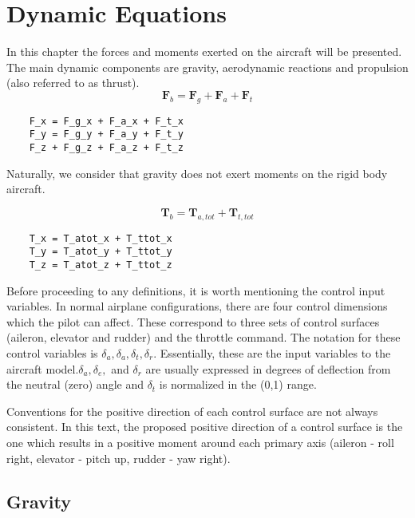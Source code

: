 \chapter{Dynamic Equations}

In this chapter the forces and moments exerted on the aircraft will be presented. The main dynamic components are gravity, aerodynamic reactions and propulsion (also referred to as thrust).
\begin{equation}
	\bm{F}_b = \bm{F}_g + \bm{F}_a + \bm{F}_t
\end{equation}

\begin{lstlisting}
	F_x = F_g_x + F_a_x + F_t_x
	F_y = F_g_y + F_a_y + F_t_y
	F_z + F_g_z + F_a_z + F_t_z
\end{lstlisting}

Naturally, we consider that gravity does not exert moments on the rigid body aircraft.

\begin{equation}
	\bm{T}_b = \bm{T}_{a,tot} + \bm{T}_{t,tot}
\end{equation}

\begin{lstlisting}
	T_x = T_atot_x + T_ttot_x
	T_y = T_atot_y + T_ttot_y
	T_z = T_atot_z + T_ttot_z
\end{lstlisting}

Before proceeding to any definitions, it is worth mentioning the control input variables. In normal airplane configurations, there are four control dimensions which the pilot can affect. These correspond to three sets of control surfaces (aileron, elevator and rudder) and the throttle command. The notation for these control variables is $\delta_a, \delta_a, \delta_t, \delta_r$. Essentially, these are the input variables to the aircraft model.$\delta_a, \delta_e,$ and $\delta_r$ are usually expressed in degrees of deflection from the neutral (zero) angle and $\delta_t$ is normalized in the (0,1) range.

Conventions for the positive direction of each control surface are not always consistent. In this text, the proposed positive direction of a control surface is the one which results in a positive moment around each primary axis (aileron - roll right, elevator - pitch up, rudder - yaw right).

\section{Gravity}

